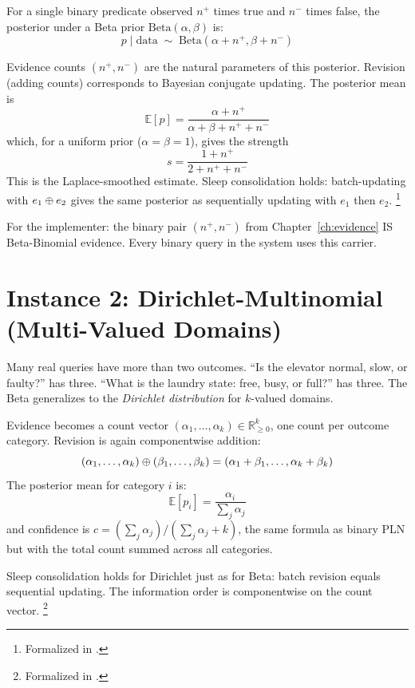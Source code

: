 \documentclass[11pt,openany]{report}
\begin{document}
For a single binary predicate observed $n^+$ times true and $n^-$ times
false, the posterior under a Beta prior $\text{Beta}(\alpha, \beta)$ is:
\[
  p \mid \text{data} \;\sim\; \text{Beta}(\alpha + n^+, \beta + n^-)
\]

Evidence counts $(n^+, n^-)$ are the natural parameters of this
posterior.  Revision (adding counts) corresponds to Bayesian conjugate
updating.  The posterior mean is
\[
  \mathbb{E}[p] = \frac{\alpha + n^+}{\alpha + \beta + n^+ + n^-}
\]
which, for a uniform prior ($\alpha = \beta = 1$), gives the strength
\[
  s = \frac{1 + n^+}{2 + n^+ + n^-}
\]
This is the Laplace-smoothed estimate.  Sleep consolidation holds:
batch-updating with $e_1 \oplus e_2$ gives the same posterior as
sequentially updating with $e_1$ then $e_2$.%
\footnote{Formalized in .}

For the implementer: the binary pair $(n^+, n^-)$ from
Chapter~\ref{ch:evidence} IS Beta-Binomial evidence.  Every binary
query in the system uses this carrier.

\section{Instance 2: Dirichlet-Multinomial (Multi-Valued Domains)}

Many real queries have more than two outcomes.  ``Is the elevator
normal, slow, or faulty?'' has three.  ``What is the laundry state:
free, busy, or full?'' has three.  The Beta generalizes to the
\emph{Dirichlet distribution} for $k$-valued domains.

Evidence becomes a count vector $(\alpha_1, \ldots, \alpha_k) \in
\mathbb{R}_{\ge 0}^k$, one count per outcome category.  Revision is
again componentwise addition:
\[
  (\alpha_1, \ldots, \alpha_k) \oplus (\beta_1, \ldots, \beta_k)
  = (\alpha_1 + \beta_1, \ldots, \alpha_k + \beta_k)
\]
The posterior mean for category $i$ is:
\[
  \mathbb{E}[p_i] = \frac{\alpha_i}{\sum_j \alpha_j}
\]
and confidence is $c = (\sum_j \alpha_j) / (\sum_j \alpha_j + k)$,
the same formula as binary PLN but with the total count summed
across all categories.

Sleep consolidation holds for Dirichlet just as for Beta: batch
revision equals sequential updating.  The information order is
componentwise on the count vector.%
\footnote{Formalized in .}

\end{document}
